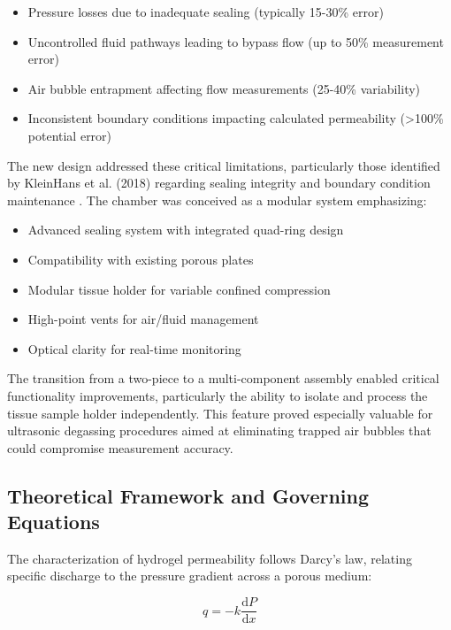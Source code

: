 \begin{itemize}
    \item Pressure losses due to inadequate sealing (typically 15-30\% error)
    \item Uncontrolled fluid pathways leading to bypass flow (up to 50\% measurement error)
    \item Air bubble entrapment affecting flow measurements (25-40\% variability)
    \item Inconsistent boundary conditions impacting calculated permeability (>100\% potential error)
\end{itemize}

The new design addressed these critical limitations, particularly those identified by KleinHans et al. (2018) regarding sealing integrity and boundary condition maintenance \citep{kleinhans2018permeation}. The chamber was conceived as a modular system emphasizing:

\begin{itemize}
    \item Advanced sealing system with integrated quad-ring design
    \item Compatibility with existing porous plates
    \item Modular tissue holder for variable confined compression
    \item High-point vents for air/fluid management
    \item Optical clarity for real-time monitoring
\end{itemize}

The transition from a two-piece to a multi-component assembly enabled critical functionality improvements, particularly the ability to isolate and process the tissue sample holder independently. This feature proved especially valuable for ultrasonic degassing procedures aimed at eliminating trapped air bubbles that could compromise measurement accuracy.

\subsection{Theoretical Framework and Governing Equations}
The characterization of hydrogel permeability follows Darcy's law, relating specific discharge to the pressure gradient across a porous medium:

\begin{equation}
    q = -k \frac{\mathrm{d}P}{\mathrm{d}x}
\end{equation}

